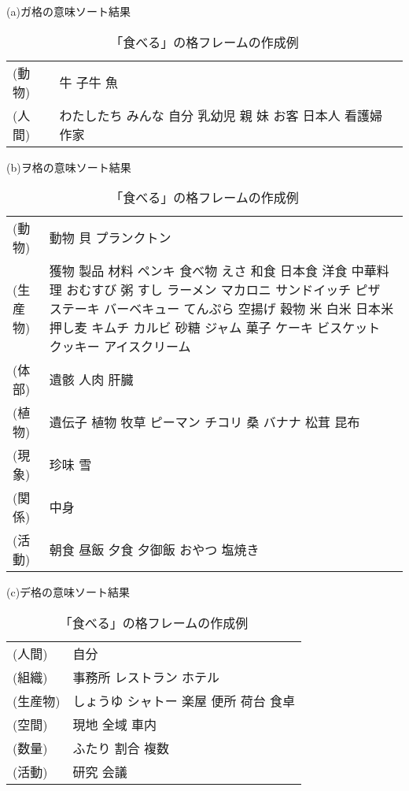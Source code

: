 \begin{table}[t]
  \caption{「食べる」の格フレームの作成例}
  \label{tab:taberu_case_frame}
  \begin{center}
\small\renewcommand{\arraystretch}{}
(a)ガ格の意味ソート結果

\begin{tabular}[c]{|lp{10cm}|}\hline
(動物) &  牛 子牛 魚\\
(人間) &  わたしたち みんな 自分 乳幼児 親 妹 お客 日本人 看護婦 作家\\\hline
\end{tabular}

\vspace{0.3cm}

(b)ヲ格の意味ソート結果

\begin{tabular}[c]{|lp{10cm}|}\hline
(動物) &  動物 貝 プランクトン\\
(生産物) & 獲物 製品 材料 ペンキ 食べ物 えさ 和食 日本食 洋食 中華料理 おむすび 粥 すし ラーメン マカロニ サンドイッチ ピザ ステーキ バーベキュー てんぷら 空揚げ 穀物 米 白米 日本米 押し麦 キムチ カルビ 砂糖 ジャム 菓子 ケーキ ビスケット クッキー アイスクリーム \\
(体部) &  遺骸 人肉 肝臓\\
(植物) &  遺伝子 植物 牧草 ピーマン チコリ 桑 バナナ 松茸 昆布\\
(現象) &  珍味 雪 \\
(関係) &  中身\\
(活動) &  朝食 昼飯 夕食 夕御飯 おやつ 塩焼き \\\hline
\end{tabular}

\vspace{0.3cm}

(c)デ格の意味ソート結果

\begin{tabular}[c]{|lp{10cm}|}\hline
(人間) &  自分 \\
(組織) &  事務所 レストラン ホテル \\
(生産物) & しょうゆ シャトー 楽屋 便所 荷台 食卓 \\
(空間) &  現地 全域 車内 \\
(数量) &  ふたり 割合 複数 \\
(活動) &  研究 会議 \\\hline
\end{tabular}

\end{center}
\end{table}

